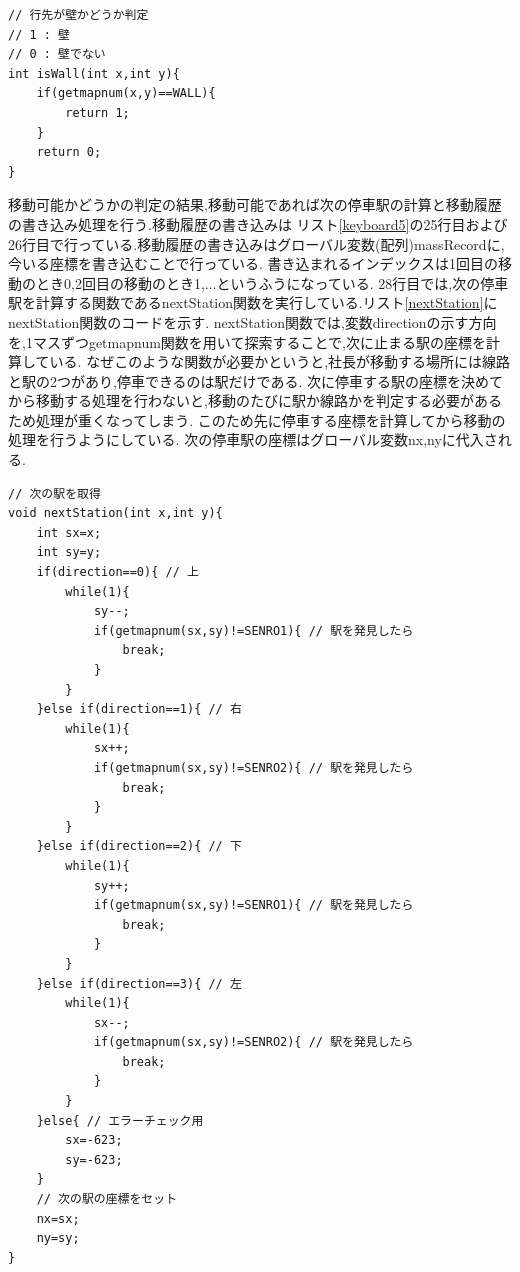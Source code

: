 \documentclass[a4j]{jarticle}
\begin{document}
    \begin{lstlisting}[basicstyle=\ttfamily\footnotesize, frame=single,label=isWall,caption=isWall関数]
// 行先が壁かどうか判定
// 1 : 壁
// 0 : 壁でない
int isWall(int x,int y){
    if(getmapnum(x,y)==WALL){
        return 1;
    }
    return 0;
}
    \end{lstlisting}  
    
    移動可能かどうかの判定の結果,移動可能であれば次の停車駅の計算と移動履歴の書き込み処理を行う.移動履歴の書き込みは
    リスト\ref{keyboard5}の25行目および26行目で行っている.移動履歴の書き込みはグローバル変数(配列)massRecordに,
    今いる座標を書き込むことで行っている. 書き込まれるインデックスは1回目の移動のとき0,2回目の移動のとき1,$\dots$というふうになっている.
    28行目では,次の停車駅を計算する関数であるnextStation関数を実行している.リスト\ref{nextStation}にnextStation関数のコードを示す.
    nextStation関数では,変数directionの示す方向を,1マスずつgetmapnum関数を用いて探索することで,次に止まる駅の座標を計算している.
    なぜこのような関数が必要かというと,社長が移動する場所には線路と駅の2つがあり,停車できるのは駅だけである.
    次に停車する駅の座標を決めてから移動する処理を行わないと,移動のたびに駅か線路かを判定する必要があるため処理が重くなってしまう.
    このため先に停車する座標を計算してから移動の処理を行うようにしている. 次の停車駅の座標はグローバル変数nx,nyに代入される.
    \begin{lstlisting}[basicstyle=\ttfamily\footnotesize, frame=single,label=nextStation,caption=nextStation関数]
// 次の駅を取得
void nextStation(int x,int y){
    int sx=x;
    int sy=y;
    if(direction==0){ // 上
        while(1){
            sy--;
            if(getmapnum(sx,sy)!=SENRO1){ // 駅を発見したら
                break;
            }
        }
    }else if(direction==1){ // 右
        while(1){
            sx++;
            if(getmapnum(sx,sy)!=SENRO2){ // 駅を発見したら
                break;
            }
        }
    }else if(direction==2){ // 下
        while(1){
            sy++;
            if(getmapnum(sx,sy)!=SENRO1){ // 駅を発見したら
                break;
            }
        }
    }else if(direction==3){ // 左
        while(1){
            sx--;
            if(getmapnum(sx,sy)!=SENRO2){ // 駅を発見したら
                break;
            }
        }
    }else{ // エラーチェック用
        sx=-623;
        sy=-623;
    }
    // 次の駅の座標をセット
    nx=sx;
    ny=sy;
}
    \end{lstlisting}  
\end{document}
